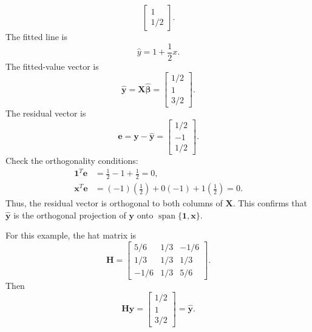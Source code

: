 {\begin{equation}
\begin{bmatrix}
    1 \\
    1/2
  \end{bmatrix}.
\end{equation}
The fitted line is
\begin{equation}
  \widehat{y}=1+\frac{1}{2}x.
\end{equation}
The fitted-value vector is
\begin{equation}
  \widehat{\mathbf{y}}
  =\mathbf{X}\widehat{\boldsymbol{\beta}}
  =
  \begin{bmatrix}
    1/2 \\
    1 \\
    3/2
  \end{bmatrix}.
\end{equation}
The residual vector is
\begin{equation}
  \mathbf{e}=\mathbf{y}-\widehat{\mathbf{y}}
  =
  \begin{bmatrix}
    1/2 \\
    -1 \\
    1/2
  \end{bmatrix}.
\end{equation}
Check the orthogonality conditions:
\begin{align}
  \mathbf{1}^T\mathbf{e}
  &=\frac{1}{2}-1+\frac{1}{2}=0, \\
  \mathbf{x}^T\mathbf{e}
  &=(-1)\left(\frac{1}{2}\right)+0(-1)+1\left(\frac{1}{2}\right)=0.
\end{align}
Thus, the residual vector is orthogonal to both columns of \(\mathbf{X}\).  This confirms that \(\widehat{\mathbf{y}}\) is the orthogonal projection of \(\mathbf{y}\) onto \(\operatorname{span}\{\mathbf{1},\mathbf{x}\}\).

For this example, the hat matrix is
\begin{equation}
  \mathbf{H}
  =
  \begin{bmatrix}
    5/6 & 1/3 & -1/6 \\
    1/3 & 1/3 & 1/3 \\
    -1/6 & 1/3 & 5/6
  \end{bmatrix}.
\end{equation}
Then
\begin{equation}
  \mathbf{H}\mathbf{y}
  =
  \begin{bmatrix}
    1/2\\1\\3/2
  \end{bmatrix}
  =\widehat{\mathbf{y}}.
\end{equation}
}


